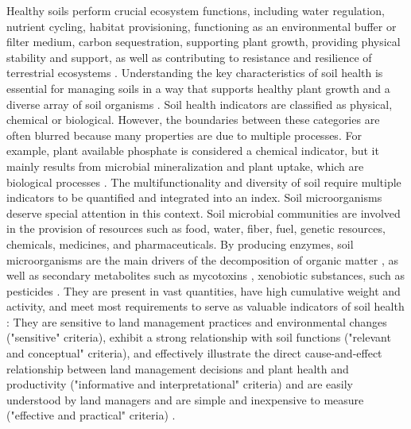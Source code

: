 Healthy soils perform crucial ecosystem functions, including water regulation, nutrient cycling, habitat provisioning, functioning as an environmental buffer or filter medium, carbon sequestration, supporting plant growth, providing physical stability and support, as well as contributing to resistance and resilience of terrestrial ecosystems \citep{maikhuri2012soil, lehmann2020concept, doran2000soil}. 
Understanding the key characteristics of soil health is essential for managing soils in a way that supports healthy plant growth and a diverse array of soil organisms \citep{lehmann2020concept}. Soil health indicators are classified as physical, chemical or biological. However, the boundaries between these categories are often blurred because many properties are due to multiple processes. For example, plant available phosphate is considered a chemical indicator, but it mainly results from microbial mineralization and plant uptake, which are biological processes \citep{lehmann2020concept}. The multifunctionality and diversity of soil require multiple indicators to be quantified and integrated into an index. Soil microorganisms deserve special attention in this context. Soil microbial communities are involved in the provision of resources such as food, water, fiber, fuel, genetic resources, chemicals, medicines, and pharmaceuticals. By producing enzymes, soil microorganisms are the main drivers of the decomposition of organic matter \citep{hattenschwiler2005biodiversity, prasad2021soil}, as well as secondary metabolites such as mycotoxins \citep{juraschek2022mycotoxins}, xenobiotic substances, such as pesticides \citep{parte2017microbial}. They are present in vast quantities, have high cumulative weight and activity, and meet most requirements to serve as valuable indicators of soil health \citep{sacca2017ecosystem}: They are sensitive to land management practices and environmental changes ("sensitive" criteria), exhibit a strong relationship with soil functions ("relevant and conceptual" criteria), and effectively illustrate the direct cause-and-effect relationship between land management decisions and plant health and productivity ("informative and interpretational" criteria) and are easily understood by land managers and are simple and inexpensive to measure ("effective and practical" criteria) \citep{sacca2017ecosystem, doran2000soil}.




